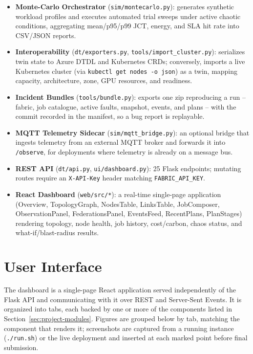 \documentclass[12pt,a4]{report}
\begin{document}
\begin{itemize}
    \item \textbf{Monte-Carlo Orchestrator} (\texttt{sim/montecarlo.py}): generates synthetic workload profiles and executes automated trial sweeps under active chaotic conditions, aggregating mean/p95/p99 JCT, energy, and SLA hit rate into CSV/JSON reports.
    \item \textbf{Interoperability} (\texttt{dt/exporters.py}, \texttt{tools/import\_cluster.py}): serializes twin state to Azure DTDL and Kubernetes CRDs; conversely, imports a live Kubernetes cluster (via \texttt{kubectl get nodes -o json}) as a twin, mapping capacity, architecture, zone, GPU resources, and readiness.
    \item \textbf{Incident Bundles} (\texttt{tools/bundle.py}): exports one zip reproducing a run -- fabric, job catalogue, active faults, snapshot, events, and plans -- with the commit recorded in the manifest, so a bug report is replayable.
    \item \textbf{MQTT Telemetry Sidecar} (\texttt{sim/mqtt\_bridge.py}): an optional bridge that ingests telemetry from an external MQTT broker and forwards it into \texttt{/observe}, for deployments where telemetry is already on a message bus.
    \item \textbf{REST API} (\texttt{dt/api.py}, \texttt{ui/dashboard.py}): 25 Flask endpoints; mutating routes require an \texttt{X-API-Key} header matching \texttt{FABRIC\_API\_KEY}.
    \item \textbf{React Dashboard} (\texttt{web/src/*}): a real-time single-page application (Overview, TopologyGraph, NodesTable, LinksTable, JobComposer, ObservationPanel, FederationsPanel, EventsFeed, RecentPlans, PlanStages) rendering topology, node health, job history, cost/carbon, chaos status, and what-if/blast-radius results.
\end{itemize}

\section{User Interface}

The dashboard is a single-page React application served independently of the Flask API and communicating with it over REST and Server-Sent Events. It is organized into tabs, each backed by one or more of the components listed in Section~\ref{sec:project-modules}. Figures are grouped below by tab, matching the component that renders it; screenshots are captured from a running instance (\texttt{./run.sh}) or the live deployment and inserted at each marked point before final submission.
\end{document}
